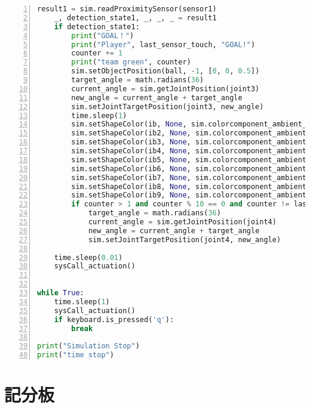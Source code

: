 \begin{lstlisting}[language=Python, frame=single, numbers=left, captionpos=b, basicstyle=\ttfamily\small, showstringspaces=false, breaklines=true, tabsize=4, xleftmargin=15pt]
    result1 = sim.readProximitySensor(sensor1)
    _, detection_state1, _, _, _ = result1
    if detection_state1:
        print("GOAL！")
        print("Player", last_sensor_touch, "GOAL!")
        counter += 1
        print("team green", counter)
        sim.setObjectPosition(ball, -1, [0, 0, 0.5])
        target_angle = math.radians(36)
        current_angle = sim.getJointPosition(joint3)
        new_angle = current_angle + target_angle
        sim.setJointTargetPosition(joint3, new_angle)
        time.sleep(1)
        sim.setShapeColor(ib, None, sim.colorcomponent_ambient_diffuse, [0, 0, 1])
        sim.setShapeColor(ib2, None, sim.colorcomponent_ambient_diffuse, [0, 0, 1])
        sim.setShapeColor(ib3, None, sim.colorcomponent_ambient_diffuse, [1, 1, 1])
        sim.setShapeColor(ib4, None, sim.colorcomponent_ambient_diffuse, [1, 1, 1])
        sim.setShapeColor(ib5, None, sim.colorcomponent_ambient_diffuse, [1, 1, 1])
        sim.setShapeColor(ib6, None, sim.colorcomponent_ambient_diffuse, [0, 0, 0])
        sim.setShapeColor(ib7, None, sim.colorcomponent_ambient_diffuse, [1, 1, 1])
        sim.setShapeColor(ib8, None, sim.colorcomponent_ambient_diffuse, [1, 1, 1])
        sim.setShapeColor(ib9, None, sim.colorcomponent_ambient_diffuse, [1, 1, 1])
        if counter > 1 and counter % 10 == 0 and counter != last_executed_multiple + 1:
            target_angle = math.radians(36)
            current_angle = sim.getJointPosition(joint4)
            new_angle = current_angle + target_angle
            sim.setJointTargetPosition(joint4, new_angle)
 
    time.sleep(0.01)
    sysCall_actuation()
 
 
while True:
    time.sleep(1)
    sysCall_actuation()
    if keyboard.is_pressed('q'):
        break
 
print("Simulation Stop")
print("time stop")
\end{lstlisting}


\section{記分板}

